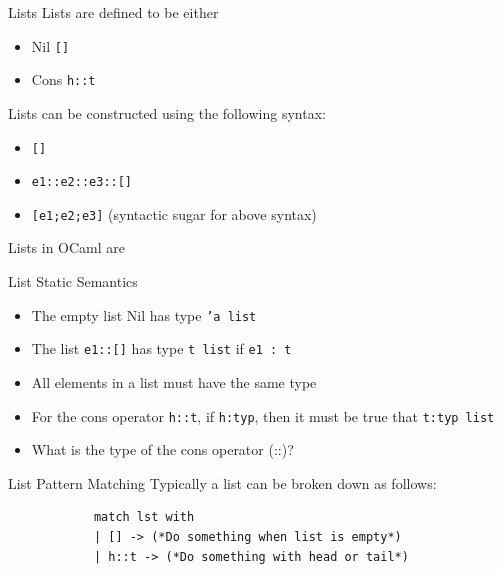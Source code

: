 \documentclass{beamer}
\begin{document}
    \begin{frame}[fragile]{Lists}
    Lists are defined to be either 
    \begin{itemize}
        \item Nil \texttt{[]}
        \item Cons \texttt{h::t}
    \end{itemize} \pause
    
    Lists can be constructed using the following syntax:
    \begin{itemize}
        \item \texttt{[]}
        \item \texttt{e1::e2::e3::[]}
        \item \texttt{[e1;e2;e3]} (syntactic sugar for above syntax)
    \end{itemize}
    Lists in OCaml are
    \end{frame}
    
    
    \begin{frame}{List Static Semantics}
    \begin{itemize}
        \item The empty list Nil has type \texttt{'a list} \pause
        
        \item The list \texttt{e1::[]} has type \texttt{t list} if \texttt{e1 : t} \pause
        
        \item All elements in a list must have the same type \pause
        
        \item For the cons operator \texttt{h::t}, if \texttt{h:typ}, then it must be true that \texttt{t:typ list} \pause
        
        \item What is the type of the cons operator (::)?
    \end{itemize}
    \end{frame}
    
    \begin{frame}[fragile]{List Pattern Matching}
        Typically a list can be broken down as follows:
        \noindent\begin{verbatim}
            match lst with
            | [] -> (*Do something when list is empty*)
            | h::t -> (*Do something with head or tail*)
        \end{verbatim}
    \end{frame}
    
\end{document}
